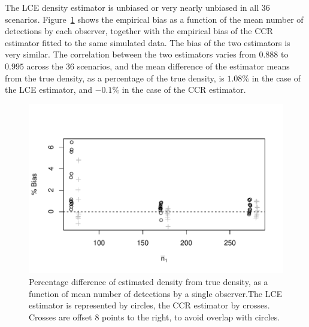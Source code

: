 \documentclass[useAMS, usenatbib, referee]{biom}\usepackage[]{graphicx}\usepackage[]{color}
\makeatletter
\def\maxwidth{ %
  \ifdim\Gin@nat@width>\linewidth
    \linewidth
  \else
    \Gin@nat@width
  \fi
}
\newenvironment{knitrout}{}{} %
\makeatother
\begin{document}
The LCE density estimator is unbiased or very nearly unbiased in all 36 scenarios. Figure~\ref{fig:fig_mlepalm_bias_bcs} shows the empirical bias as a function of the mean number of detections by each observer, together with the empirical bias of the CCR estimator fitted to the same simulated data. The bias of the two estimators is very similar. The correlation between the two estimators varies from $0.888$ to $0.995$ across the 36 scenarios, and the mean difference of the estimator means from the true density, as a percentage of the true density, is $1.08\%$ in the case of the LCE estimator, and $-0.1\%$ in the case of the CCR estimator.

\begin{knitrout}
\color{fgcolor}\begin{figure}

{\centering \includegraphics[width=\maxwidth]{figs/fig_mlepalm_bias_bcs-1} 

}

\caption[Percentage difference of estimated density from true density, as a function of mean number of detections by a single observer.The LCE estimator is represented by circles, the CCR estimator by crosses]{Percentage difference of estimated density from true density, as a function of mean number of detections by a single observer.The LCE estimator is represented by circles, the CCR estimator by crosses. Crosses are offset 8 points to the right, to avoid overlap with circles.}\label{fig:fig_mlepalm_bias_bcs}
\end{figure}


\end{knitrout}
\end{document}
